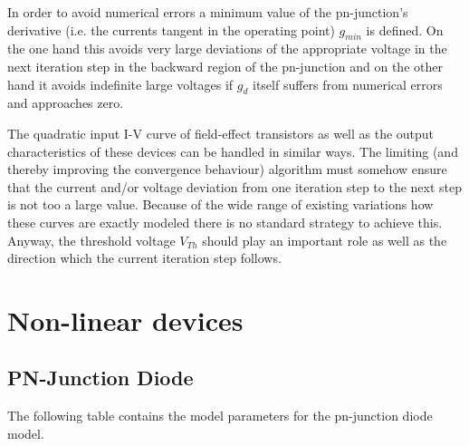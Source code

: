 \documentclass[10pt]{report}
\begin{document}
In order to avoid numerical errors a minimum value of the
pn-junction's derivative (i.e. the currents tangent in the operating
point) $g_{min}$ is defined.  On the one hand this avoids very large
deviations of the appropriate voltage in the next iteration step in
the backward region of the pn-junction and on the other hand it avoids
indefinite large voltages if $g_d$ itself suffers from numerical
errors and approaches zero.

\addvspace{12pt}

The quadratic input I-V curve of field-effect transistors as well as
the output characteristics of these devices can be handled in similar
ways.  The limiting (and thereby improving the convergence behaviour)
algorithm must somehow ensure that the current and/or voltage
deviation from one iteration step to the next step is not too a large
value.  Because of the wide range of existing variations how these
curves are exactly modeled there is no standard strategy to achieve
this.  Anyway, the threshold voltage $V_{Th}$ should play an important
role as well as the direction which the current iteration step
follows.

\chapter{Non-linear devices}

\section{PN-Junction Diode}

The following table contains the model parameters for the pn-junction
diode model.

\addvspace{12pt}
\end{document}
